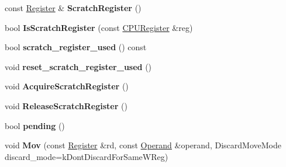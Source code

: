 \begin{DoxyCompactItemize}
\item 
const \hyperlink{structv8_1_1internal_1_1_register}{Register} \& {\bfseries Scratch\+Register} ()\hypertarget{classv8_1_1internal_1_1_b_a_s_e___e_m_b_e_d_d_e_d_aeae432ef3a5492f1e2e748507dc6cf5b}{}\label{classv8_1_1internal_1_1_b_a_s_e___e_m_b_e_d_d_e_d_aeae432ef3a5492f1e2e748507dc6cf5b}

\item 
bool {\bfseries Is\+Scratch\+Register} (const \hyperlink{structv8_1_1internal_1_1_c_p_u_register}{C\+P\+U\+Register} \&reg)\hypertarget{classv8_1_1internal_1_1_b_a_s_e___e_m_b_e_d_d_e_d_a55341a2089244995b21ec070a78d490e}{}\label{classv8_1_1internal_1_1_b_a_s_e___e_m_b_e_d_d_e_d_a55341a2089244995b21ec070a78d490e}

\item 
bool {\bfseries scratch\+\_\+register\+\_\+used} () const \hypertarget{classv8_1_1internal_1_1_b_a_s_e___e_m_b_e_d_d_e_d_a2f8c51b82f7e2481c630f06320d35354}{}\label{classv8_1_1internal_1_1_b_a_s_e___e_m_b_e_d_d_e_d_a2f8c51b82f7e2481c630f06320d35354}

\item 
void {\bfseries reset\+\_\+scratch\+\_\+register\+\_\+used} ()\hypertarget{classv8_1_1internal_1_1_b_a_s_e___e_m_b_e_d_d_e_d_a6222f8816910ad2dad5a1beae9ca8574}{}\label{classv8_1_1internal_1_1_b_a_s_e___e_m_b_e_d_d_e_d_a6222f8816910ad2dad5a1beae9ca8574}

\item 
void {\bfseries Acquire\+Scratch\+Register} ()\hypertarget{classv8_1_1internal_1_1_b_a_s_e___e_m_b_e_d_d_e_d_a6a6ce15ceaf4f26986b23f78591194ab}{}\label{classv8_1_1internal_1_1_b_a_s_e___e_m_b_e_d_d_e_d_a6a6ce15ceaf4f26986b23f78591194ab}

\item 
void {\bfseries Release\+Scratch\+Register} ()\hypertarget{classv8_1_1internal_1_1_b_a_s_e___e_m_b_e_d_d_e_d_a4fc8020b097528e258d143860e8ab64e}{}\label{classv8_1_1internal_1_1_b_a_s_e___e_m_b_e_d_d_e_d_a4fc8020b097528e258d143860e8ab64e}

\item 
bool {\bfseries pending} ()\hypertarget{classv8_1_1internal_1_1_b_a_s_e___e_m_b_e_d_d_e_d_a07c967b57a0d650bf74443436a2f8b84}{}\label{classv8_1_1internal_1_1_b_a_s_e___e_m_b_e_d_d_e_d_a07c967b57a0d650bf74443436a2f8b84}

\item 
void {\bfseries Mov} (const \hyperlink{structv8_1_1internal_1_1_register}{Register} \&rd, const \hyperlink{classv8_1_1internal_1_1_operand}{Operand} \&operand, Discard\+Move\+Mode discard\+\_\+mode=k\+Dont\+Discard\+For\+Same\+W\+Reg)\hypertarget{classv8_1_1internal_1_1_b_a_s_e___e_m_b_e_d_d_e_d_aabacc6b56f606af6ec1c95109f94d13c}{}\label{classv8_1_1internal_1_1_b_a_s_e___e_m_b_e_d_d_e_d_aabacc6b56f606af6ec1c95109f94d13c}


\end{DoxyCompactItemize}
